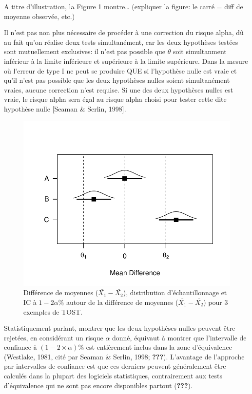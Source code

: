 \documentclass[
  english,
  man]{apa6}
\begin{document}
A titre d'illustration, la Figure \ref{fig:equiv1} montre\ldots{} (expliquer la figure: le carré = diff de moyenne observée, etc.)

Il n'est pas non plus nécessaire de procéder à une correction du risque alpha, dû au fait qu'on réalise deux tests simultanément, car les deux hypothèses testées sont mutuellement exclusives: il n'est pas possible que \(\theta\) soit simultanment inférieur à la limite inférieure et supérieure à la limite supérieure. Dans la mesure où l'erreur de type I ne peut se produire QUE si l'hypothèse nulle est vraie et qu'il n'est pas possible que les deux hypothèses nulles soient simultanément vraies, aucune correction n'est requise. Si une des deux hypothèses nulles est vraie, le risque alpha sera égal au risque alpha choisi pour tester cette dite hypothèse nulle {[}Seaman \& Serlin, 1998{]}.

\begin{figure}

{\centering \includegraphics{chp5_files/figure-latex/equiv1-1} 

}

\caption{Différence de moyennes ($\bar{X_1}-\bar{X_2}$), distribution d'échantillonnage et IC à $1-2\alpha\%$ autour de la différence de moyennes ($\bar{X_1}-\bar{X_2}$) pour 3 exemples de TOST.}\label{fig:equiv1}
\end{figure}

Statistiquement parlant, montrer que les deux hypothèses nulles peuvent être rejetées, en considérant un risque \(\alpha\) donné, équivaut à montrer que l'intervalle de confiance à \((1-2\times\alpha)\%\) est entièrement inclus dans la zone d'équivalence (Westlake, 1981, cité par Seaman \& Serlin, 1998; {\textbf{???}}). L'avantage de l'approche par intervalles de confiance est que ces derniers peuvent généralement être calculés dans la plupart des logiciels statistiques, contrairement aux tests d'équivalence qui ne sont pas encore disponibles partout ({\textbf{???}}).
\end{document}
